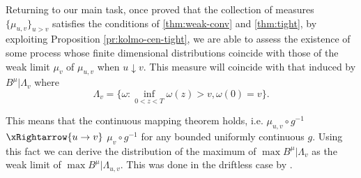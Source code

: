 Returning to our main task, once proved that the collection of measures $ \{\mu_{u,v}\}_{u > v}$ satisfies the conditions of \autoref{thm:weak-conv} and \autoref{thm:tight}, by exploiting Proposition \autoref{pr:kolmo-cen-tight}, we are able to assess the existence of some process whose finite dimensional distributions 
coincide with those of the weak limit $ \mu_v $ of $ \mu_{u,v}$ when $ u \downarrow v $. This measure will coincide with that induced by
$ B^\mu | \Lambda_v $ where 
\[
\Lambda_v = \Big \{\omega : \inf_{ 0 < z < T } \omega(z) > v , \omega(0)  = v \Big \}.
\]

This means that the continuous mapping theorem holds, i.e.
 $ \mu_{u,v} \circ g^{-1}$  \raisebox{-3pt} {$\xRightarrow{u\to v }$ }$  \mu_{v} \circ g^{-1} $ for any bounded uniformly continuous $ g $. 
 Using this fact we can derive the distribution of the maximum of $ \max B^\mu | \Lambda_v $ as the weak limit 
 of $ \max B^\mu | \Lambda_{u,v} $. 
 This was done in the driftless case by \citet{iglehart77}.
